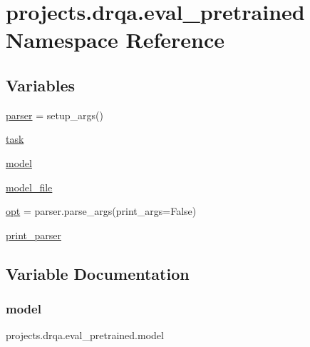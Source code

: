 \hypertarget{namespaceprojects_1_1drqa_1_1eval__pretrained}{}\section{projects.\+drqa.\+eval\+\_\+pretrained Namespace Reference}
\label{namespaceprojects_1_1drqa_1_1eval__pretrained}
\subsection*{Variables}
\begin{DoxyCompactItemize}
\item 
\hyperlink{namespaceprojects_1_1drqa_1_1eval__pretrained_a37675240be4a773ee4829182e7c26f74}{parser} = setup\+\_\+args()
\item 
\hyperlink{namespaceprojects_1_1drqa_1_1eval__pretrained_af546af874d2aec2dc8fa6acc80d0bdad}{task}
\item 
\hyperlink{namespaceprojects_1_1drqa_1_1eval__pretrained_ac17d62ebe678c501feaeea4fba395d77}{model}
\item 
\hyperlink{namespaceprojects_1_1drqa_1_1eval__pretrained_ac70db4d56b0ba5d6f2ebbd7edfe54b58}{model\+\_\+file}
\item 
\hyperlink{namespaceprojects_1_1drqa_1_1eval__pretrained_ae8d8e4f7e660780380ee0e5c3b73c02a}{opt} = parser.\+parse\+\_\+args(print\+\_\+args=False)
\item 
\hyperlink{namespaceprojects_1_1drqa_1_1eval__pretrained_a3d2f1d2e6627a7c2e64a604ee822cb27}{print\+\_\+parser}
\end{DoxyCompactItemize}


\subsection{Variable Documentation}
\mbox{\label{namespaceprojects_1_1drqa_1_1eval__pretrained_ac17d62ebe678c501feaeea4fba395d77}} 
\subsubsection{\texorpdfstring{model}{model}}
{\footnotesize\ttfamily projects.\+drqa.\+eval\+\_\+pretrained.\+model}

